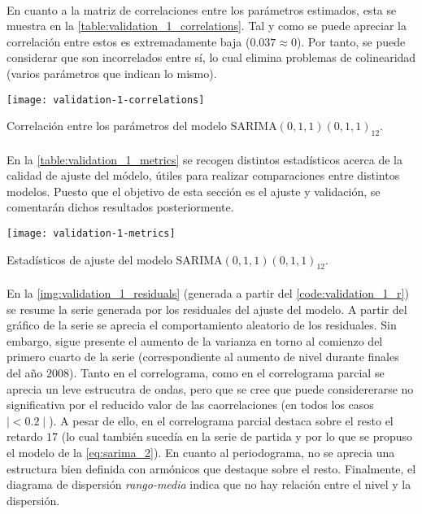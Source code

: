 \documentclass[a4paper, spanish]{article}
\begin{document}
      \paragraph{}
      En cuanto a la matriz de correlaciones entre los parámetros estimados, esta se muestra en la \autoref{table:validation_1_correlations}. Tal y como se puede apreciar la correlación entre estos es extremadamente baja ($0.037 \approx 0$). Por tanto, se puede considerar que son incorrelados entre sí, lo cual elimina problemas de colinearidad (varios parámetros que indican lo mismo).

      \begin{table}[htb!]
        \centering
        \texttt{[image: validation-1-correlations]}
        \caption{Correlación entre los parámetros del modelo $\text{SARIMA}(0, 1, 1)(0, 1, 1)_{12}$.}
        \label{table:validation_1_correlations}
      \end{table}

      \paragraph{}
      En la \autoref{table:validation_1_metrics} se recogen distintos estadísticos acerca de la calidad de ajuste del módelo, útiles para realizar comparaciones entre distintos modelos. Puesto que el objetivo de esta sección es el ajuste y validación, se comentarán dichos resultados posteriormente.

      \begin{table}[htb!]
        \centering
        \texttt{[image: validation-1-metrics]}
        \caption{Estadísticos de ajuste del modelo $\text{SARIMA}(0, 1, 1)(0, 1, 1)_{12}$.}
        \label{table:validation_1_metrics}
      \end{table}

      \paragraph{}
      En la \autoref{img:validation_1_residuals} (generada a partir del \autoref{code:validation_1_r}) se resume la serie generada por los residuales del ajuste del modelo. A partir del gráfico de la serie se aprecia el comportamiento aleatorio de los residuales. Sin embargo, sigue presente el aumento de la varianza en torno al comienzo del primero cuarto de la serie (correspondiente al aumento de nivel durante finales del año $2008$). Tanto en el correlograma, como en el correlograma parcial se aprecia un leve estrucutra de ondas, pero que se cree que puede considererarse no significativa por el reducido valor de las caorrelaciones (en todos los casos $\mid < 0.2 \mid$). A pesar de ello, en el correlograma parcial destaca sobre el resto el retardo $17$ (lo cual también sucedía en la serie de partida y por lo que se propuso el modelo de la \autoref{eq:sarima_2}). En cuanto al periodograma, no se aprecia una estructura bien definida con armónicos que destaque sobre el resto. Finalmente, el diagrama de dispersión \emph{rango-media} indica que no hay relación entre el nivel y la dispersión.
\end{document}

